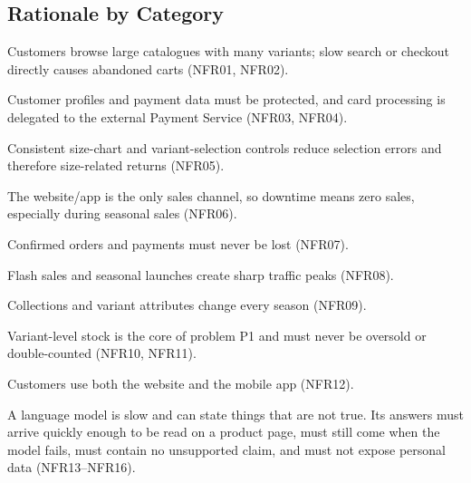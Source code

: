\documentclass[11pt,a4paper,oneside]{extreport}
\newif\ifshowvtwo
\newcommand{\upd}[1]{\ifshowvtwo\textcolor{red}{#1}\else#1\fi}
\begin{document}
\subsection{Rationale by Category}
\begin{description}[leftmargin=0pt,itemsep=2pt]
  \item[Performance.] Customers browse large catalogues with many variants; slow search or checkout directly causes abandoned carts (NFR01, NFR02).
  \item[Security.] Customer profiles and payment data must be protected, and card processing is delegated to the external Payment Service (NFR03, NFR04).
  \item[Usability.] Consistent size-chart and variant-selection controls reduce selection errors and therefore size-related returns (NFR05).
  \item[Availability.] The website/app is the only sales channel, so downtime means zero sales, especially during seasonal sales (NFR06).
  \item[Reliability.] Confirmed orders and payments must never be lost (NFR07).
  \item[Scalability.] Flash sales and seasonal launches create sharp traffic peaks (NFR08).
  \item[Maintainability.] Collections and variant attributes change every season (NFR09).
  \item[Data Integrity.] Variant-level stock is the core of problem P1 and must never be oversold or double-counted (NFR10, NFR11).
  \item[Compatibility.] Customers use both the website and the mobile app (NFR12).
  \item[\upd{AI assistant.}] \upd{A language model is slow and can state things that are not true. Its answers must arrive quickly enough to be read on a product page, must still come when the model fails, must contain no unsupported claim, and must not expose personal data (NFR13--NFR16).}
\end{description}
\end{document}
